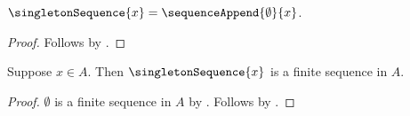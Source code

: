 \begin{proposition}\label{singleton_sequence_eq_append}
    $\singletonSequence{x}=\sequenceAppend{\emptyset}{x}$.
\end{proposition}
\begin{proof}
    Follows by
        .
\end{proof}

\begin{proposition}\label{singleton_sequence_typed}
    Suppose $x\in A$.
    Then $\singletonSequence{x}$ is a finite sequence in $A$.
\end{proposition}
\begin{proof}
    $\emptyset$ is a finite sequence in $A$ by .
    Follows by
        .
\end{proof}
